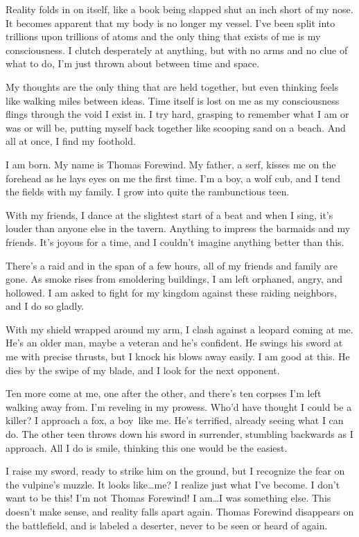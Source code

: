 Reality folds in on itself, like a book being slapped shut an inch short of my nose. It becomes apparent that my body is no longer my vessel. I've been split into trillions upon trillions of atoms and the only thing that exists of me is my consciousness. I clutch desperately at anything, but with no arms and no clue of what to do, I'm just thrown about between time and space.

My thoughts are the only thing that are held together, but even thinking feels like walking miles between ideas. Time itself is lost on me as my consciousness flings through the void I exist in. I try hard, grasping to remember what I am or was or will be, putting myself back together like scooping sand on a beach. And all at once, I find my foothold.

I am born. My name is Thomas Forewind. My father, a serf, kisses me on the forehead as he lays eyes on me the first time. I'm a boy, a wolf cub, and I tend the fields with my family. I grow into quite the rambunctious teen.

With my friends, I dance at the slightest start of a beat and when I sing, it's louder than anyone else in the tavern. Anything to impress the barmaids and my friends. It's joyous for a time, and I couldn't imagine anything better than this.

There's a raid and in the span of a few hours, all of my friends and family are gone. As smoke rises from smoldering buildings, I am left orphaned, angry, and hollowed. I am asked to fight for my kingdom against these raiding neighbors, and I do so gladly.

With my shield wrapped around my arm, I clash against a leopard coming at me. He's an older man, maybe a veteran and he's confident. He swings his sword at me with precise thrusts, but I knock his blows away easily. I am good at this. He dies by the swipe of my blade, and I look for the next opponent.

Ten more come at me, one after the other, and there's ten corpses I'm left walking away from. I'm reveling in my prowess. Who'd have thought I could be a killer? I approach a fox, a boy\pagebreak\ like me. He's terrified, already seeing what I can do. The other teen throws down his sword in surrender, stumbling backwards as I approach. All I do is smile, thinking this one would be the easiest.

I raise my sword, ready to strike him on the ground, but I recognize the fear on the vulpine's muzzle. It looks like\ldots me? I realize just what I've become. I don't want to be this! I'm not Thomas Forewind! I am\ldots I was something else. This doesn't make sense, and reality falls apart again. Thomas Forewind disappears on the battlefield, and is labeled a deserter, never to be seen or heard of again.

